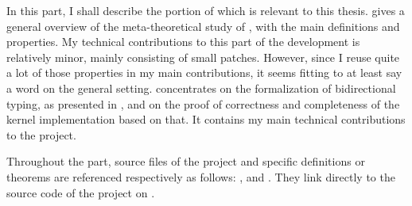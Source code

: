 In this part, I shall describe the portion of  which is relevant to this thesis.
 gives a general overview of the meta-theoretical study of ,
with the main definitions and properties.
My technical contributions to this part of the development is relatively minor,
mainly consisting of small patches. However, since I reuse quite a lot of those properties
in my main contributions, it seems fitting to at least say a word on the general setting.
 concentrates on the formalization of bidirectional typing, as
presented in , and on the proof of correctness and completeness of
the kernel implementation based on that. It contains my main technical
contributions to the  project.

Throughout the part, source files of the  project
and specific definitions or theorems are referenced respectively as follows:
, and . They link directly to the source
code of the project on .

\begin{theorem}
\label{thm:pcuic-confluence}

\end{theorem}